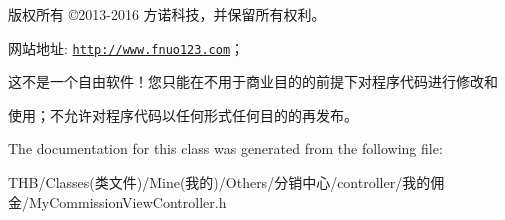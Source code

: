 版权所有 ©2013-\/2016 方诺科技，并保留所有权利。

网站地址\+: \href{http://www.fnuo123.com}{\tt http\+://www.\+fnuo123.\+com}； 



这不是一个自由软件！您只能在不用于商业目的的前提下对程序代码进行修改和

使用；不允许对程序代码以任何形式任何目的的再发布。 

 

The documentation for this class was generated from the following file\+:\begin{DoxyCompactItemize}
\item 
T\+H\+B/\+Classes(类文件)/\+Mine(我的)/\+Others/分销中心/controller/我的佣金/My\+Commission\+View\+Controller.\+h\end{DoxyCompactItemize}
